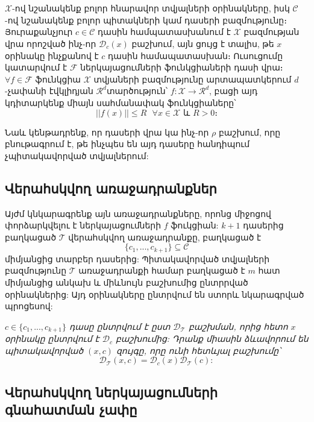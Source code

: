 \documentclass[11pt]{article}
\begin{document}
\section*{\hfill 
 \hfill} \noindent
{}
{}
 
 $\mathcal{X}$-ով նշանակենք բոլոր հնարավոր տվյալների օրինակները, իսկ $\mathcal{C}$-ով նշանակենք բոլոր պիտակների կամ դասերի բազմությունը։ Յուրաքանչյուր $c \in \mathcal{C}$ դասին համպատասխանում է $\mathcal{X}$ բազմության վրա որոշված ինչ-որ $\mathcal{D}_c(x)$ բաշխում, այն ցույց է տալիս, թե $x$ օրինակը ինչքանով է $c$ դասին համապատասխան։ Ուսուցումը կատարվում է $\mathcal{F}$ ներկայացումների ֆունկցիաների դասի վրա։ $\forall f \in \mathcal{F}$  ֆունկցիա $\mathcal{X}$ տվյաների բազմությունը արտապատկերում $d$-չափանի էվկլիդյան $\mathcal{R}^d$տարծություն՝ $f:\mathcal{X}\rightarrow\mathcal{R}^d$, բացի այդ կդիտարկենք միայն սահմանափակ ֆունկցիաները՝
 $$||f(x)|| \leq R \text{    } \forall x \in \mathcal{X} \text{ և } R > 0։$$ 


\noindent Նաև կենթադրենք, որ դասերի վրա կա ինչ-որ $\rho$ բաշխում, որը բնութագրում է, թե ինչպես են այդ դասերը հանդիպում չպիտակավորված տվյալներում:

\subsection*{Վերահսկվող առաջադրանքներ}

\par Այժմ կնկարագրենք այն առաջադրանքները, որոնց միջոցով փորձարկվելու է ներկայացումների $f$ ֆուկցիան: $k+1$ դասերից բաղկացած $\mathcal{T}$ վերահսկվող առաջադրանքը, բաղկացած է $$\{c_1, ..., c_{k+1}\} \subseteq \mathcal{C}$$
միմյանցից տարբեր դասերից: Պիտակավորված տվյալների բազմությունը $\mathcal{T}$ առաջադրանքի համար բաղկացած է $m$ հատ միմյանցից անկախ և միևնույն բաշխումից ընտրրված օրինակներից: Այդ օրինակները ընտրվում են ստորև նկարագրված պրոցեսով:

\textit{$c \in \{c_1, ..., c_{k+1}\} $   դասը ընտրվում է ըստ $\mathcal{D}_{\mathcal{T}}$ բաշխման, որից հետո $x$ օրինակը ընտրվում է $\mathcal{D}_c$ բաշխումից: Դրանք միասին ձևավորում են պիտակավորված $(x, c)$ զույգը, որը ունի հետևյալ բաշխումը՝
$$\mathcal{D}_{\mathcal{T}} (x, c) = \mathcal{D}_{c}(x)\mathcal{D}_{\mathcal{T}}(c):$$}

\subsection*{Վերահսկվող ներկայացումների գնահատման չափը}
\end{document}
